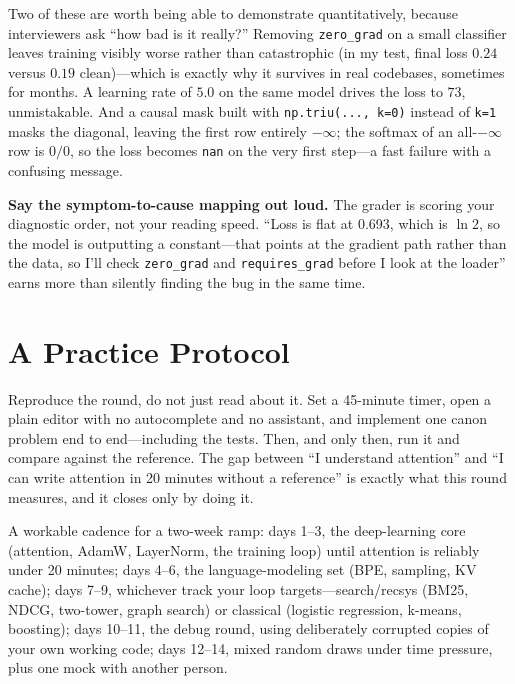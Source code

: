 Two of these are worth being able to demonstrate quantitatively, because interviewers ask ``how bad is it really?'' Removing \texttt{zero\_grad} on a small classifier leaves training visibly worse rather than catastrophic (in my test, final loss $0.24$ versus $0.19$ clean)---which is exactly why it survives in real codebases, sometimes for months. A learning rate of $5.0$ on the same model drives the loss to $73$, unmistakable. And a causal mask built with \texttt{np.triu(..., k=0)} instead of \texttt{k=1} masks the diagonal, leaving the first row entirely $-\infty$; the softmax of an all-$-\infty$ row is $0/0$, so the loss becomes \texttt{nan} on the very first step---a fast failure with a confusing message.

\begin{warningbox}
\textbf{Say the symptom-to-cause mapping out loud.} The grader is scoring your diagnostic order, not your reading speed. ``Loss is flat at 0.693, which is $\ln 2$, so the model is outputting a constant---that points at the gradient path rather than the data, so I'll check \texttt{zero\_grad} and \texttt{requires\_grad} before I look at the loader'' earns more than silently finding the bug in the same time.
\end{warningbox}

\section{A Practice Protocol}
\label{sec:coding_practice}

Reproduce the round, do not just read about it. Set a 45-minute timer, open a plain editor with no autocomplete and no assistant, and implement one canon problem end to end---including the tests. Then, and only then, run it and compare against the reference. The gap between ``I understand attention'' and ``I can write attention in 20 minutes without a reference'' is exactly what this round measures, and it closes only by doing it.

A workable cadence for a two-week ramp: days 1--3, the deep-learning core (attention, AdamW, LayerNorm, the training loop) until attention is reliably under 20 minutes; days 4--6, the language-modeling set (BPE, sampling, KV cache); days 7--9, whichever track your loop targets---search/recsys (BM25, NDCG, two-tower, graph search) or classical (logistic regression, k-means, boosting); days 10--11, the debug round, using deliberately corrupted copies of your own working code; days 12--14, mixed random draws under time pressure, plus one mock with another person.

